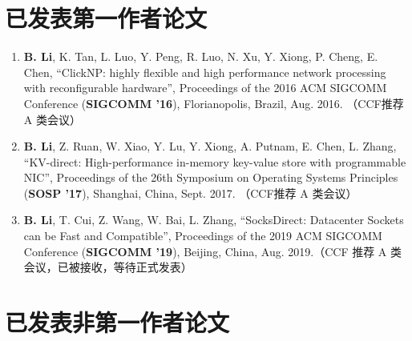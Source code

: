 
\begin{publications}

\section*{已发表第一作者论文}

\begin{enumerate}
\item \textbf{B. Li}, K. Tan, L. Luo, Y. Peng, R. Luo, N. Xu, Y. Xiong, P. Cheng, E. Chen, ``ClickNP: highly flexible and high performance network processing with reconfigurable hardware'', Proceedings of the 2016 ACM SIGCOMM Conference (\textbf{SIGCOMM '16}), Florianopolis, Brazil, Aug. 2016. （CCF推荐 A 类会议）
\item \textbf{B. Li}, Z. Ruan, W. Xiao, Y. Lu, Y. Xiong, A. Putnam, E. Chen, L. Zhang, ``KV-direct: High-performance in-memory key-value store with programmable NIC'', Proceedings of the 26th Symposium on Operating Systems Principles (\textbf{SOSP '17}), Shanghai, China, Sept. 2017. （CCF推荐 A 类会议）
\item \textbf{B. Li}, T. Cui, Z. Wang, W. Bai, L. Zhang, ``SocksDirect: Datacenter Sockets can be Fast and Compatible'', Proceedings of the 2019 ACM SIGCOMM Conference (\textbf{SIGCOMM '19}), Beijing, China, Aug. 2019.（CCF 推荐 A 类会议，已被接收，等待正式发表）
\end{enumerate}

\section*{已发表非第一作者论文}


\end{publications}
